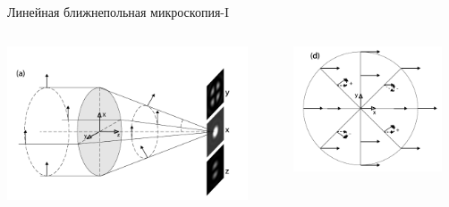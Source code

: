 \documentclass[9pt, compress, xcolor=table]{beamer}
\begin{document}
\begin{frame}{Линейная ближнепольная микроскопия-I}

\begin{columns}[c]
\column{6.5cm}
\begin{center}
\includegraphics[width=0.9\textwidth]{sm0}
\end{center}

\column{6.5cm}
\begin{center}
\includegraphics[width=0.9\textwidth]{sm1}
\end{center}
\end{columns}
\end{frame}
\end{document}
